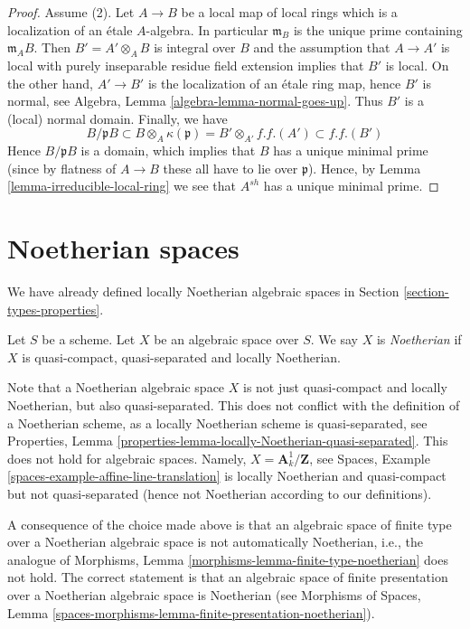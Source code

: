\begin{proof}
\medskip\noindent
Assume (2). Let $A \to B$ be a local map of local rings which is a
localization of an \'etale $A$-algebra. In particular $\mathfrak m_B$
is the unique prime containing $\mathfrak m_AB$. Then $B' = A' \otimes_A B$
is integral over $B$ and the assumption that $A \to A'$ is local
with purely inseparable residue field extension implies that $B'$
is local. On the other hand, $A' \to B'$ is the localization
of an \'etale ring map, hence $B'$ is normal, see
Algebra, Lemma \ref{algebra-lemma-normal-goes-up}.
Thus $B'$ is a (local) normal domain. Finally, we have
$$
B/\mathfrak pB \subset B \otimes_A \kappa(\mathfrak p)
= B' \otimes_{A'} f.f.(A') \subset f.f.(B')
$$
Hence $B/\mathfrak pB$ is a domain, which implies that $B$ has a unique
minimal prime (since by flatness of $A \to B$ these all have to lie
over $\mathfrak p$). Hence, by
Lemma \ref{lemma-irreducible-local-ring}
we see that $A^{sh}$ has a unique minimal prime.
\end{proof}










\section{Noetherian spaces}
\label{section-noetherian}

\noindent
We have already defined locally Noetherian algebraic spaces in
Section \ref{section-types-properties}.

\begin{definition}
\label{definition-noetherian}
Let $S$ be a scheme. Let $X$ be an algebraic space over $S$.
We say $X$ is {\it Noetherian} if $X$ is quasi-compact, quasi-separated
and locally Noetherian.
\end{definition}

\noindent
Note that a Noetherian algebraic space $X$ is not just quasi-compact
and locally Noetherian, but also quasi-separated. This does not conflict
with the definition of a Noetherian scheme, as a locally Noetherian
scheme is quasi-separated, see
Properties, Lemma \ref{properties-lemma-locally-Noetherian-quasi-separated}.
This does not hold for algebraic spaces. Namely,
$X = \mathbf{A}^1_k/\mathbf{Z}$, see
Spaces, Example \ref{spaces-example-affine-line-translation}
is locally Noetherian and quasi-compact but not quasi-separated
(hence not Noetherian according to our definitions).

\medskip\noindent
A consequence of the choice made above is that an algebraic space
of finite type over a Noetherian algebraic space is not automatically
Noetherian, i.e., the analogue of
Morphisms, Lemma \ref{morphisms-lemma-finite-type-noetherian}
does not hold. The correct statement is that an algebraic space of
finite presentation over a Noetherian algebraic space is Noetherian
(see
Morphisms of Spaces,
Lemma \ref{spaces-morphisms-lemma-finite-presentation-noetherian}).

